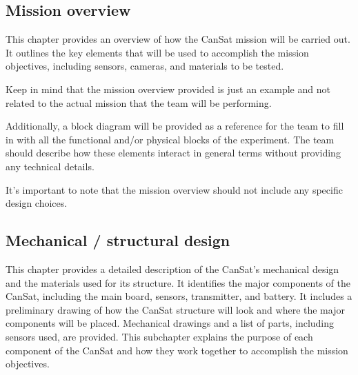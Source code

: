 \documentclass[11pt]{article}
\begin{document}
\subsection{Mission overview}
This chapter provides an overview of how the CanSat mission will be carried out. It outlines the key elements that will be used to accomplish the mission objectives, including sensors, cameras, and materials to be tested. 


Keep in mind that the mission overview provided is just an example and not related to the actual mission that the team will be performing.

Additionally, a block diagram will be provided as a reference for the team to fill in with all the functional and/or physical blocks of the experiment. The team should describe how these elements interact in general terms without providing any technical details.

It's important to note that the mission overview should not include any specific design choices.


\subsection{Mechanical / structural design}
This chapter provides a detailed description of the CanSat's mechanical design and the materials used for its structure. It identifies the major components of the CanSat, including the main board, sensors, transmitter, and battery. It includes a preliminary drawing of how the CanSat structure will look and where the major components will be placed. Mechanical drawings and a list of parts, including sensors used, are provided. This subchapter explains the purpose of each component of the CanSat and how they work together to accomplish the mission objectives.
\end{document}
